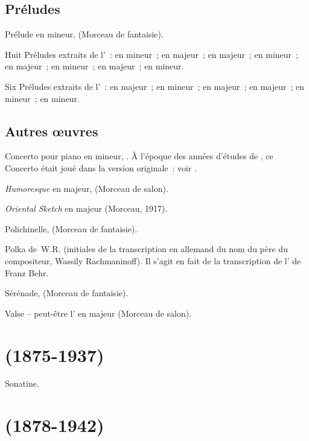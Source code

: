 \subsection{Préludes}

Prélude en \kC \Sharp mineur,   (Morceau de fantaisie).

Huit Préludes extraits de l'~:  en \kF \Sharp mineur~;
 en \kB \Flat majeur~;  en \kD majeur~;  en
\kG mineur~;  en \kE \Flat majeur~;  en \kC mineur~;
 en \kA \Flat majeur~;  en \kE \Flat mineur.

Six Préludes extraits de l'~:  en \kC majeur~; 
en \kB \Flat mineur~;  en \kE majeur~;  en \kG majeur~;
 en \kA mineur~;  en \kG \Sharp mineur.

\subsection{Autres œuvres}

Concerto pour piano  en \kF \Sharp mineur, .
À l'époque des années d'études de \VSofronitsky{}, ce Concerto était joué
dans la version originale~: voir \citet[p.~81, note~10]{White}.

\emph{Humoresque} en \kG majeur,   (Morceau de salon).

\emph{Oriental Sketch} en \kB \Flat majeur (Morceau, 1917).

Polichinelle,   (Morceau de fantaisie).

Polka de~W.R. (initiales de la transcription en allemand du nom du père du
compositeur, Wassily Rachmaninoff).
Il s'agit en fait de la transcription de l' de Franz Behr.

Sérénade,   (Morceau de fantaisie).

Valse -- peut-être l'  en \kA majeur (Morceau de salon).

\section[%
Maurice Ravel (1875-1937)]{%
\MRavel{} (1875-1937)}

Sonatine.

\section[%
Leonid Nikolaev (1878-1942)]{%
\LNikolaiev{} (1878-1942)}

